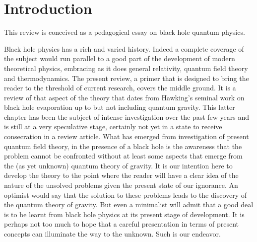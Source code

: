 \documentclass[12pt,oneside]{report}
\makeatletter
\newcommand{\INTRO}[1]
{
\renewcommand{\thechapter}{\fnsymbol{chapter}}
\setcounter{chapter}{-1}
\renewcommand{\@chapapp}{}
\chapter{#1}
\renewcommand{\thechapter}{\arabic{chapter}}
\renewcommand{\@chapapp}{Chapter}
}
\makeatother
\begin{document}
\INTRO{Introduction}
\par This review is conceived as a pedagogical essay on black hole quantum
physics.
\par Black hole physics has a rich and varied history. Indeed a
 complete coverage of the subject would run parallel to a good part of the
development
of modern theoretical physics, embracing as it does general
relativity, quantum field theory and thermodynamics. The present review, a
primer that is
designed to bring the reader to the threshold of current research, covers
the middle ground.
It is a review of that aspect of the theory that dates from Hawking's seminal
 work on black hole evaporation up to but not including quantum gravity.
This latter
chapter has been the subject of intense investigation over the past few years
 and is still at a very speculative stage, certainly not yet in a 
state to receive consecration in a review article. What has emerged from
investigation
of present quantum field theory, in the presence of a black hole is the
awareness
that the problem cannot be confronted without at least some aspects that
emerge from the
(as yet unknown) quantum theory of gravity. It is our intention here to
develop the 
theory to the point where the reader will have a clear idea 
of the nature of the unsolved problems given the present state of our
ignorance. An optimist
would say that the solution to these problems leads to the discovery 
of the quantum theory of gravity. But even a minimalist will admit that a
good deal is to
 be learnt from black hole physics 
at its present stage of development. It is perhaps not too
much to hope that a careful presentation in terms 
of present concepts can illuminate the way to the unknown. Such is our endeavor.
\end{document}

